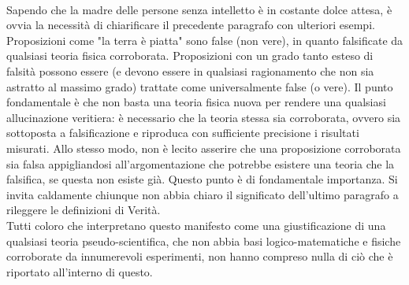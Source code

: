 \documentclass[]{article}
\begin{document}
	\\
	Sapendo che la madre delle persone senza intelletto è in costante dolce attesa, è ovvia la necessità di chiarificare il precedente paragrafo con ulteriori esempi. Proposizioni come "la terra è piatta" sono false (non vere), in quanto falsificate da qualsiasi teoria fisica corroborata. Proposizioni con un grado tanto esteso di falsità possono essere (e devono essere in qualsiasi ragionamento che non sia astratto al massimo grado) trattate come universalmente false (o vere).
	Il punto fondamentale è che non basta una teoria fisica nuova per rendere una qualsiasi allucinazione veritiera: è necessario che la teoria stessa sia corroborata, ovvero sia sottoposta a falsificazione e riproduca con sufficiente precisione i risultati misurati. Allo stesso modo, non è lecito asserire che una proposizione corroborata sia falsa appigliandosi all'argomentazione che potrebbe esistere una teoria che la falsifica, se questa non esiste già. Questo punto è di fondamentale importanza.		
	Si invita caldamente chiunque non abbia chiaro il significato dell'ultimo paragrafo a rileggere le definizioni di Verità.\\
	Tutti coloro che interpretano questo manifesto come una giustificazione di una qualsiasi teoria pseudo-scientifica, che non abbia basi logico-matematiche e fisiche corroborate da innumerevoli esperimenti, non hanno compreso nulla di ciò che è riportato all'interno di questo.
\end{document}
